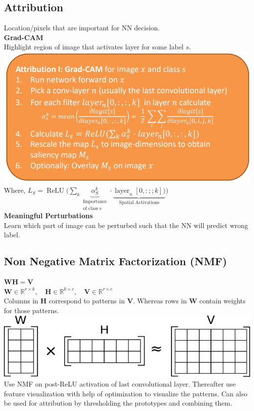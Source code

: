 \documentclass[11pt]{extarticle}
\begin{document}
\begin{multicols*}{3}
		    \subsection*{Attribution} Location/pixels that are important for NN decision.\\
		    \textbf{Grad-CAM}\\
		    Highlight region of image that activates layer for some label $s$.\\
	        \includegraphics[width=\linewidth]{attribution.png}\\
	        Where, 
	        $L _ { S } = \operatorname {ReLU} {\bigg (} \sum _ { k } \underbrace { \alpha _ { S } ^ { k }}_{\substack{\text{Importance}\\ \text{of class s}}} \cdot \underbrace {\operatorname { layer } _ { n } [ 0 , : ; ; k ] ) } _ { \text { Spatial Activations } } {\bigg )}$\\
	        \textbf{Meaningful Perturbations}\\
	        Learn which part of image can be perturbed such that the NN will predict wrong label.\\
			\subsection*{Non Negative Matrix Factorization (NMF)}	
			$\mathbf {W} \mathbf {H} = \mathbf {V}  $\\
		    $\mathbf {W}\in \mathbb{R}^{r \times k}, \quad \mathbf {H}\in \mathbb{R}^{k \times c}, \quad \mathbf {V} \in \mathbb{R}^{r \times c} $\\
		    Columns in $\mathbf {H} $ correspond to patterns in $\mathbf {V}$. Whereas rows in $\mathbf {W} $ contain weights for those patterns.\\
	        \includegraphics[width=\linewidth]{NMF.png}\\
	        Use NMF on post-ReLU activation of last convolutional layer. Thereafter use feature visualization with help of optimization to visualize the patterns. Can also be used for attribution by thresholding the prototypes and combining them.

\end{multicols*}
\end{document}
